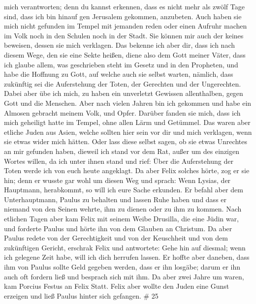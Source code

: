 mich verantworten;  denn du kannst erkennen, dass es nicht
mehr als zwölf Tage sind, dass ich bin hinauf gen Jerusalem gekommen,
anzubeten.  Auch haben sie mich nicht gefunden im Tempel
mit jemanden reden oder einen Aufruhr machen im Volk noch in den Schulen
noch in der Stadt.  Sie können mir auch der keines
beweisen, dessen sie mich verklagen.  Das bekenne ich aber
dir, dass ich nach diesem Wege, den sie eine Sekte heißen, diene also
dem Gott meiner Väter, dass ich glaube allem, was geschrieben steht im
Gesetz und in den Propheten,  und habe die Hoffnung zu
Gott, auf welche auch sie selbst warten, nämlich, dass zukünftig sei die
Auferstehung der Toten, der Gerechten und der Ungerechten. 
Dabei aber übe ich mich, zu haben ein unverletzt Gewissen allenthalben,
gegen Gott und die Menschen.  Aber nach vielen Jahren bin
ich gekommen und habe ein Almosen gebracht meinem Volk, und Opfer.
 Darüber fanden sie mich, dass ich mich geheiligt hatte im
Tempel, ohne allen Lärm und Getümmel.  Das waren aber
etliche Juden aus Asien, welche sollten hier sein vor dir und mich
verklagen, wenn sie etwas wider mich hätten.  Oder lass
diese selbst sagen, ob sie etwas Unrechtes an mir gefunden haben,
dieweil ich stand vor dem Rat,  außer um des einzigen
Wortes willen, da ich unter ihnen stand und rief: Über die Auferstehung
der Toten werde ich von euch heute angeklagt.  Da aber
Felix solches hörte, zog er sie hin; denn er wusste gar wohl um diesen
Weg und sprach: Wenn Lysias, der Hauptmann, herabkommt, so will ich eure
Sache erkunden.  Er befahl aber dem Unterhauptmann, Paulus
zu behalten und lassen Ruhe haben und dass er niemand von den Seinen
wehrte, ihm zu dienen oder zu ihm zu kommen.  Nach etlichen
Tagen aber kam Felix mit seinem Weibe Drusilla, die eine Jüdin war, und
forderte Paulus und hörte ihn von dem Glauben an Christum. 
Da aber Paulus redete von der Gerechtigkeit und von der Keuschheit und
von dem zukünftigen Gericht, erschrak Felix und antwortete: Gehe hin auf
diesmal; wenn ich gelegene Zeit habe, will ich dich herrufen lassen.
 Er hoffte aber daneben, dass ihm von Paulus sollte Geld
gegeben werden, dass er ihn losgäbe; darum er ihn auch oft fordern ließ
und besprach sich mit ihm.  Da aber zwei Jahre um waren,
kam Porcius Festus an Felix Statt. Felix aber wollte den Juden eine
Gunst erzeigen und ließ Paulus hinter sich gefangen. \# 25 
